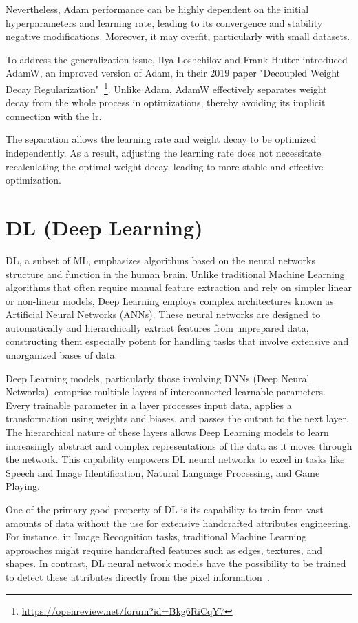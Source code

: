 \documentclass[12pt,a4paper]{report}
\begin{document}
Nevertheless, Adam performance can be highly dependent on the initial hyperparameters and learning rate, leading to its convergence and stability negative modifications. Moreover, it may overfit, particularly with small datasets.

To address the generalization issue, Ilya Loshchilov and Frank Hutter introduced AdamW, an improved version of Adam, in their 2019 paper "Decoupled Weight Decay Regularization"~\footnote{\url{https://openreview.net/forum?id=Bkg6RiCqY7}}. Unlike Adam, AdamW effectively separates weight decay from the whole process in optimizations, thereby avoiding its implicit connection with the lr.

The separation allows the learning rate and weight decay to be optimized independently. As a result, adjusting the learning rate does not necessitate recalculating the optimal weight decay, leading to more stable and effective optimization.

\section{DL (Deep Learning)}
DL, a subset of ML, emphasizes algorithms based on the neural networks structure and function in the human brain. Unlike traditional Machine Learning algorithms that often require manual feature extraction and rely on simpler linear or non-linear models, Deep Learning employs complex architectures known as Artificial Neural Networks (ANNs). These neural networks are designed to automatically and hierarchically extract features from unprepared data, constructing them especially potent for handling tasks that involve extensive and unorganized bases of data.

Deep Learning models, particularly those involving DNNs (Deep Neural Networks), comprise multiple layers of interconnected learnable parameters. Every trainable parameter in a layer processes input data, applies a transformation using weights and biases, and passes the output to the next layer. The hierarchical nature of these layers allows Deep Learning models to learn increasingly abstract and complex representations of the data as it moves through the network. This capability empowers DL neural networks to excel in tasks like Speech and Image Identification, Natural Language Processing, and Game Playing.

One of the primary good property of DL is its capability to train from vast amounts of data without the use for extensive handcrafted attributes engineering. For instance, in Image Recognition tasks, traditional Machine Learning approaches might require handcrafted features such as edges, textures, and shapes. In contrast, DL neural network models have the possibility to be trained to detect these attributes directly from the pixel information~\cite{deeplearning}.
\end{document}
